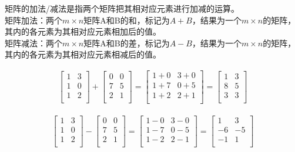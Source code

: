 \vspace{0.5cm}


\vspace{0.5cm}

矩阵的加法/减法是指两个矩阵把其相对应元素进行加减的运算。 \\

矩阵加法：两个$ m \times n $矩阵A和B的和，标记为$ A + B $，结果为一个$ m \times n $的矩阵，其内的各元素为其相对应元素相加后的值。 \\

矩阵减法：两个$ m \times n $矩阵A和B的差，标记为$ A - B $，结果为一个$ m \times n $的矩阵，其内的各元素为其相对应元素相减后的值。

\begin{align}\nonumber
	\left[\begin{matrix}
			1 & 3 \\
			1 & 0 \\
			1 & 2 \\
		\end{matrix} \right]
	+
	\left[\begin{matrix}
			0 & 0 \\
			7 & 5 \\
			2 & 1 \\
		\end{matrix} \right]
	=
	\left[\begin{matrix}
			1+0 & 3+0 \\
			1+7 & 0+5 \\
			1+2 & 2+1 \\
		\end{matrix} \right]
	=
	\left[\begin{matrix}
			1 & 3 \\
			8 & 5 \\
			3 & 3 \\
		\end{matrix} \right]
\end{align}

\begin{align}\nonumber
	\left[\begin{matrix}
			1 & 3 \\
			1 & 0 \\
			1 & 2 \\
		\end{matrix} \right]
	-
	\left[\begin{matrix}
			0 & 0 \\
			7 & 5 \\
			2 & 1 \\
		\end{matrix} \right]
	=
	\left[\begin{matrix}
			1-0 & 3-0 \\
			1-7 & 0-5 \\
			1-2 & 2-1 \\
		\end{matrix} \right]
	=
	\left[\begin{matrix}
			1  & 3  \\
			-6 & -5 \\
			-1 & 1  \\
		\end{matrix} \right]
\end{align}


